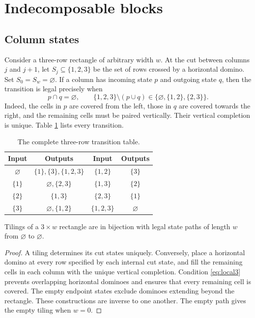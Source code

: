 \section{Indecomposable blocks}\label{sec:blocks}

\subsection{Column states}
Consider a three-row rectangle of arbitrary width $w$.
At the cut between columns $j$ and $j+1$, let
$S_j\subseteq\{1,2,3\}$ be the set of rows crossed by a horizontal
domino. Set $S_0=S_w=\varnothing$.
If a column has incoming state $p$ and outgoing state $q$, then
the transition is legal precisely when
\begin{equation}\label{eq:local3}
 p\cap q=\varnothing,\qquad
 \{1,2,3\}\setminus(p\cup q)\in
 \{\varnothing,\{1,2\},\{2,3\}\}.
\end{equation}
Indeed, the cells in $p$ are covered from the left, those in $q$
are covered towards the right, and the remaining cells must be
paired vertically. Their vertical completion is unique.
Table \ref{tab:states} lists every transition.

\begin{table}[htbp]
\centering
\caption{The complete three-row transition table.}\label{tab:states}
\begin{tabular}{cc@{\qquad}cc}
\toprule
Input & Outputs & Input & Outputs\\
\midrule
$\varnothing$ & $\{1\},\{3\},\{1,2,3\}$ &
$\{1,2\}$ & $\{3\}$\\
$\{1\}$ & $\varnothing,\{2,3\}$ &
$\{1,3\}$ & $\{2\}$\\
$\{2\}$ & $\{1,3\}$ &
$\{2,3\}$ & $\{1\}$\\
$\{3\}$ & $\varnothing,\{1,2\}$ &
$\{1,2,3\}$ & $\varnothing$\\
\bottomrule
\end{tabular}
\end{table}

\begin{lemma}\label{lem:path}
Tilings of a $3\times w$ rectangle are in bijection with legal
state paths of length $w$ from $\varnothing$ to $\varnothing$.
\end{lemma}
\begin{proof}
A tiling determines its cut states uniquely.
Conversely, place a horizontal domino at every row specified by
each internal cut state, and fill the remaining cells in each
column with the unique vertical completion.
Condition \eqref{eq:local3} prevents overlapping horizontal
dominoes and ensures that every remaining cell is covered.
The empty endpoint states exclude dominoes extending beyond the
rectangle. These constructions are inverse to one another.
The empty path gives the empty tiling when $w=0$.
\end{proof}

